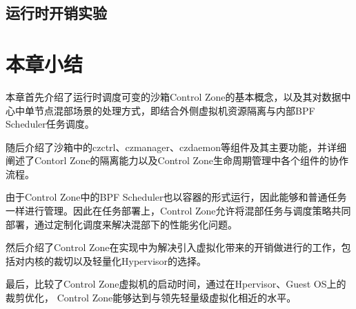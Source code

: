 \subsection{运行时开销实验}




\section{本章小结}

本章首先介绍了运行时调度可变的沙箱Control Zone的基本概念，以及其对数据中心中单节点混部场景的处理方式，即结合外侧虚拟机资源隔离与内部BPF Scheduler任务调度。

随后介绍了沙箱中的czctrl、czmanager、czdaemon等组件及其主要功能，并详细阐述了Contorl Zone的隔离能力以及Control Zone生命周期管理中各个组件的协作流程。

由于Control Zone中的BPF Scheduler也以容器的形式运行，因此能够和普通任务一样进行管理。因此在任务部署上，Control Zone允许将混部任务与调度策略共同部署，通过定制化调度来解决混部下的性能劣化问题。

然后介绍了Control Zone在实现中为解决引入虚拟化带来的开销做进行的工作，包括对内核的裁切以及轻量化Hypervisor的选择。

最后，比较了Control Zone虚拟机的启动时间，通过在Hpervisor、Guest OS上的裁剪优化， Control Zone能够达到与领先轻量级虚拟化相近的水平。